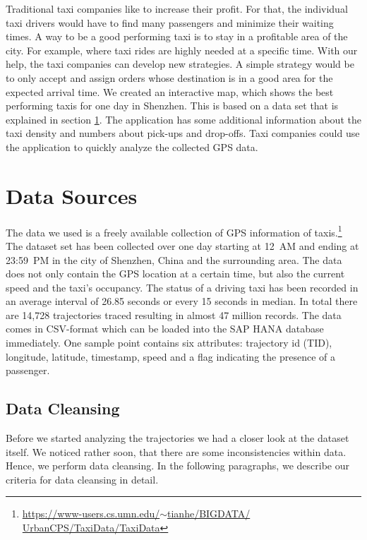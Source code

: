 \documentclass[10pt]{sig-alternate}
\begin{document}
Traditional taxi companies like to increase their profit. For that, the individual taxi drivers would have to find many passengers and minimize their waiting times. A way to be a  good performing taxi is to stay in a profitable area of the city. For example, where taxi rides are highly needed at a specific time. With our help, the taxi companies can develop new strategies. A simple strategy would be to only accept and assign orders whose destination is in a good area for the expected arrival time. We created an interactive map, which shows the best performing taxis for one day in Shenzhen. This is based on a data set that is explained in section \ref{sec:ds}. The application has some additional information about the taxi density and numbers about pick-ups and drop-offs. Taxi companies could use the application to quickly analyze the collected GPS data.\\

\section{Data Sources}
\label{sec:ds}

The data we used is a freely available collection of GPS information of taxis.\footnote{\href{https://www-users.cs.umn.edu/~tianhe/BIGDATA/UrbanCPS/TaxiData/TaxiData}{https://www-users.cs.umn.edu/$\sim$tianhe/BIGDATA/\\UrbanCPS/TaxiData/TaxiData}} The dataset set has been collected over one day starting at 12~AM and ending at 23:59~PM in the city of Shenzhen, China and the surrounding area. The data does not only contain the GPS location at a certain time, but also the current speed and the taxi's occupancy. The status of a driving taxi has been recorded in an average interval of 26.85 seconds or every 15 seconds in median. In total there are 14,728 trajectories traced resulting in almost 47 million records. The data comes in CSV-format which can be loaded into the SAP HANA database immediately. One sample point contains six attributes: trajectory id (TID), longitude, latitude, timestamp, speed and a flag indicating the presence of a passenger.

\subsection{Data Cleansing}
Before we started analyzing the trajectories we had a closer look at the dataset itself. We noticed rather soon, that there are some inconsistencies within data. Hence, we perform data cleansing. In the following paragraphs, we describe our criteria for data cleansing in detail.
\end{document}

